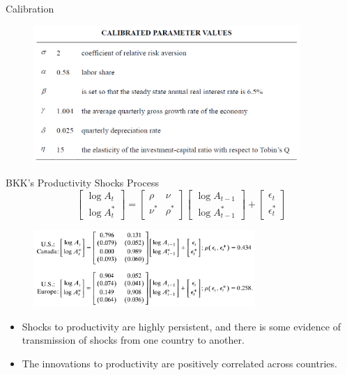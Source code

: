\documentclass[10pt]{beamer}
\begin{document}
\begin{frame}{Calibration}
\begin{figure}[thbp]
  \centering
  \includegraphics[width=0.90\textwidth]{2.png}
\end{figure}
\end{frame}

\begin{frame}{BKK's Productivity Shocks Process}
\begin{equation*}
\begin{bmatrix}
\log A_{t}\\
\log A_{t}^{*}
\end{bmatrix}
= \begin{bmatrix}
\rho & \nu\\
\nu^{*} & \rho^{*}
\end{bmatrix}
\begin{bmatrix}
\log A_{t-1}\\
\log A_{t-1}^{*}
\end{bmatrix}
+ \begin{bmatrix}
\epsilon_{t}\\
\epsilon_{t}^{*}
\end{bmatrix}
\end{equation*}

\begin{figure}[thbp]
  \centering
  \includegraphics[width=0.75\textwidth]{3.png}
\end{figure}
\begin{itemize}
  \item Shocks to productivity are \alert{highly persistent}, and there is some \alert{evidence of transmission} of shocks from one country to another.
  \item The innovations to productivity are \alert{positively correlated} across countries.
\end{itemize}
\end{frame}
\end{document}
